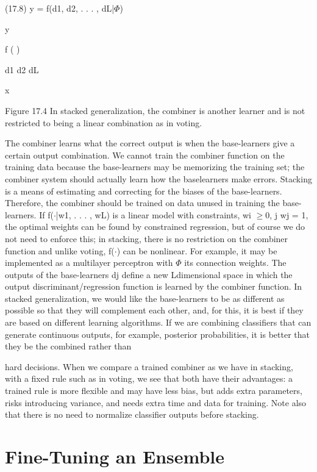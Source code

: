 (17.8) y = f(d1, d2, . . . , dL|$\Phi$)

y

f ( )

d1 d2 dL

x

Figure 17.4 In stacked generalization, the combiner is another learner and is not restricted to being a linear combination as in voting.

The combiner learns what the correct output is when the base-learners give a certain output combination. We cannot train the combiner function on the training data because the base-learners may be memorizing the training set; the combiner system should actually learn how the baselearners make errors. Stacking is a means of estimating and correcting for the biases of the base-learners. Therefore, the combiner should be trained on data unused in training the base-learners. If f($\cdot$|w1, . . . , wL) is a linear model with constraints, wi $\geq$0, j wj = 1, the optimal weights can be found by constrained regression, but of course we do not need to enforce this; in stacking, there is no restriction on the combiner function and unlike voting, f($\cdot$) can be nonlinear. For example, it may be implemented as a multilayer perceptron with $\Phi$ its connection weights. The outputs of the base-learners dj define a new Ldimensional space in which the output discriminant/regression function is learned by the combiner function. In stacked generalization, we would like the base-learners to be as different as possible so that they will complement each other, and, for this, it is best if they are based on different learning algorithms. If we are combining classifiers that can generate continuous outputs, for example, posterior probabilities, it is better that they be the combined rather than

hard decisions. When we compare a trained combiner as we have in stacking, with a fixed rule such as in voting, we see that both have their advantages: a trained rule is more flexible and may have less bias, but adds extra parameters, risks introducing variance, and needs extra time and data for training. Note also that there is no need to normalize classifier outputs before stacking.

\section{Fine-Tuning an Ensemble}

